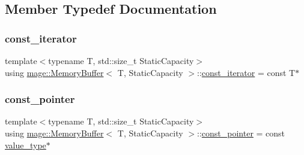 \subsection{Member Typedef Documentation}
\mbox{\label{classmage_1_1_memory_buffer_a3cc14c15660c36d35195e1836db33ee7}} 
\subsubsection{\texorpdfstring{const\+\_\+iterator}{const\_iterator}}
{\footnotesize\ttfamily template$<$typename T, std\+::size\+\_\+t Static\+Capacity$>$ \\
using \mbox{\hyperlink{classmage_1_1_memory_buffer}{mage\+::\+Memory\+Buffer}}$<$ T, Static\+Capacity $>$\+::\mbox{\hyperlink{classmage_1_1_memory_buffer_a3cc14c15660c36d35195e1836db33ee7}{const\+\_\+iterator}} =  const T$\ast$}

\mbox{\label{classmage_1_1_memory_buffer_a308c7a4b84c9efbe4bfdc64d545ff6f3}} 
\subsubsection{\texorpdfstring{const\+\_\+pointer}{const\_pointer}}
{\footnotesize\ttfamily template$<$typename T, std\+::size\+\_\+t Static\+Capacity$>$ \\
using \mbox{\hyperlink{classmage_1_1_memory_buffer}{mage\+::\+Memory\+Buffer}}$<$ T, Static\+Capacity $>$\+::\mbox{\hyperlink{classmage_1_1_memory_buffer_a308c7a4b84c9efbe4bfdc64d545ff6f3}{const\+\_\+pointer}} =  const \mbox{\hyperlink{classmage_1_1_memory_buffer_a3f8a036eaa59236b80342ba3a251c9e8}{value\+\_\+type}}$\ast$}

\mbox{\label{classmage_1_1_memory_buffer_aa54883bc0cb483fef570663344f85bb7}} 
